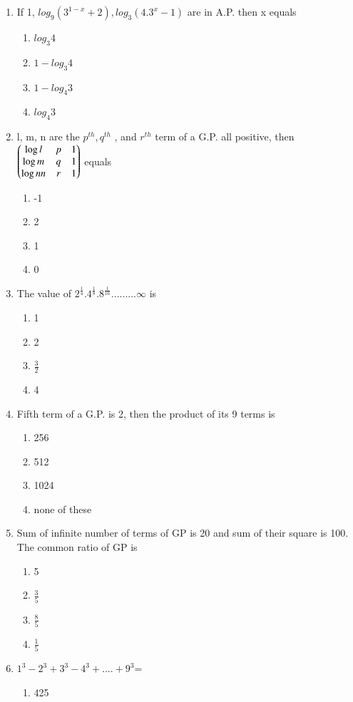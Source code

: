 \begin{enumerate}[label=\arabic*.,ref=\thesubsection.\theenumi]
\item If 1, $log_9(3^{1-x} +2),log_3(4.3^x - 1)$ are in A.P. then x equals
\begin{enumerate}
\item $log_3 4$  
\item $1- log_3 4$  
\item $1-log_4 3$  
\item $log_4 3$
\end{enumerate}
\item l, m, n are the $p^{th},q^{th}$ , and $r^{th}$ term of a G.P. all positive, then 
 $\begin{pmatrix}\log l & p & 1 \\ \log m & q  & 1 \\ \log n n & r & 1\end{pmatrix}$  equals
\begin{enumerate}
\item -1  
\item 2   
\item 1  
\item 0
\end{enumerate}
\item The value of $2^\frac{1}{4}.4^\frac{1}{8}.8^\frac{1}{16}.........\infty$ is
\begin{enumerate}
\item 1  
\item 2   
\item $\frac{3}{2}$  
\item 4
\end{enumerate}
\item Fifth term of a G.P. is 2, then the product of its 9 terms is
\begin{enumerate}
\item 256  
\item 512   
\item 1024  
\item none of these
\end{enumerate}
\item Sum of infinite number of terms of GP is 20 and sum of their square is 100. The common ratio of GP is
\begin{enumerate}
\item 5  
\item $\frac{3}{5}$   
\item $\frac{8}{5}$  
\item $\frac{1}{5}$
\end{enumerate}
\item $1^3-2^3+3^3-4^3+....+9^3$=
\begin{enumerate}
\item 425  

\end{enumerate}
\end{enumerate}
